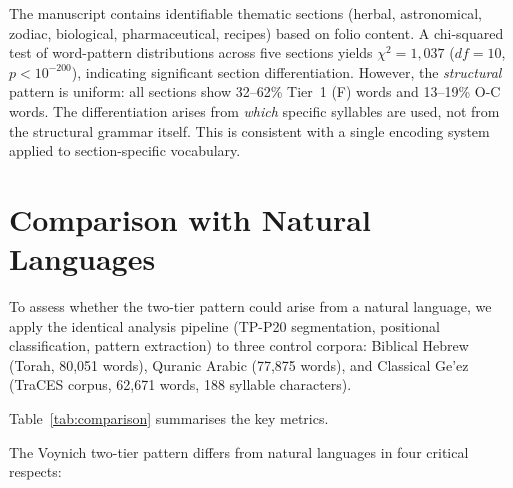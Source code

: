 The manuscript contains identifiable thematic sections (herbal, astronomical, zodiac, biological, pharmaceutical, recipes) based on folio content.  A chi-squared test of word-pattern distributions across five sections yields $\chi^2 = 1{,}037$ ($df = 10$, $p < 10^{-200}$), indicating significant section differentiation.  However, the \emph{structural} pattern is uniform: all sections show 32--62\% Tier~1 (F) words and 13--19\% O-C words.  The differentiation arises from \emph{which} specific syllables are used, not from the structural grammar itself.  This is consistent with a single encoding system applied to section-specific vocabulary.


\section{Comparison with Natural Languages}
\label{sec:comparison}

To assess whether the two-tier pattern could arise from a natural language, we apply the identical analysis pipeline (TP-P20 segmentation, positional classification, pattern extraction) to three control corpora: Biblical Hebrew (Torah, 80,051 words), Quranic Arabic (77,875 words), and Classical Ge'ez (TraCES corpus, 62,671 words, 188 syllable characters).

Table~\ref{tab:comparison} summarises the key metrics.

\begin{table}[htbp]
\caption{Two-tier structural metrics: Voynich vs.\ three natural languages.  All corpora processed with the identical TP-P20 pipeline.}
\label{tab:comparison}
\centering
{}
\end{table}

The Voynich two-tier pattern differs from natural languages in four critical respects:

